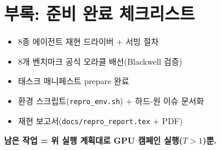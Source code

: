 \documentclass[11pt]{article}
\newcommand{\yes}{\textcolor{green!55!black}{\textbf{O}}}
\newcommand{\code}[1]{\texttt{\small #1}}
\begin{document}
\section*{부록: 준비 완료 체크리스트}
\begin{itemize}[label=\yes]
  \item 8종 에이전트 재현 드라이버 + 서빙 절차
  \item 8개 벤치마크 공식 오라클 배선(Blackwell 검증)
  \item 태스크 매니페스트 prepare 완료
  \item 환경 스크립트(\code{repro\_env.sh}) + 하드-원 이슈 문서화
  \item 재현 보고서(\code{docs/repro\_report.tex} + PDF)
\end{itemize}
\noindent\textbf{남은 작업 = 위 실행 계획대로 GPU 캠페인 실행($T{>}1$)뿐.}
\end{document}
